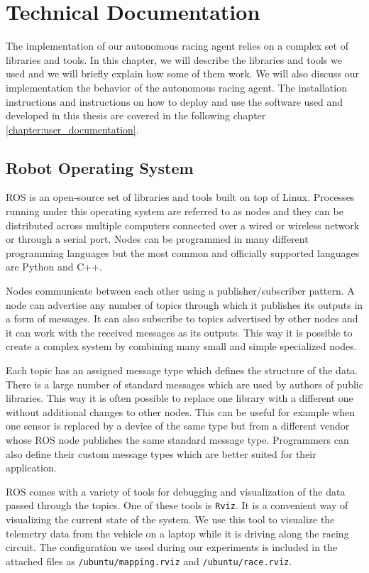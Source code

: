\chapter{Technical Documentation}
\label{chapter:technical_documentation}

The implementation of our autonomous racing agent relies on a complex set of libraries and tools. In this chapter, we will describe the libraries and tools we used and we will briefly explain how some of them work. We will also discuss our implementation the behavior of the autonomous racing agent. The installation instructions and instructions on how to deploy and use the software used and developed in this thesis are covered in the following chapter \ref{chapter:user_documentation}.

\section{Robot Operating System}

\gls{ROS} is an open-source set of libraries and tools built on top of Linux. Processes running under this operating system are referred to as nodes and they can be distributed across multiple computers connected over a wired or wireless network or through a serial port. Nodes can be programmed in many different programming languages but the most common and officially supported languages are Python and C++.

Nodes communicate between each other using a publisher/subscriber pattern. A node can advertise any number of topics through which it publishes its outputs in a form of messages. It can also subscribe to topics advertised by other nodes and it can work with the received messages as its outputs. This way it is possible to create a complex system by combining many small and simple specialized nodes.

Each topic has an assigned message type which defines the structure of the data. There is a large number of standard messages which are used by authors of public libraries. This way it is often possible to replace one library with a different one without additional changes to other nodes. This can be useful for example when one sensor is replaced by a device of the same type but from a different vendor whose \gls*{ROS} node publishes the same standard message type. Programmers can also define their custom message types which are better suited for their application.

\gls*{ROS} comes with a variety of tools for debugging and visualization of the data passed through the topics. One of these tools is \verb|Rviz|. It is a convenient way of visualizing the current state of the system. We use this tool to visualize the telemetry data from the vehicle on a laptop while it is driving along the racing circuit. The configuration we used during our experiments is included in the attached files as \verb|/ubuntu/mapping.rviz| and \verb|/ubuntu/race.rviz|.

